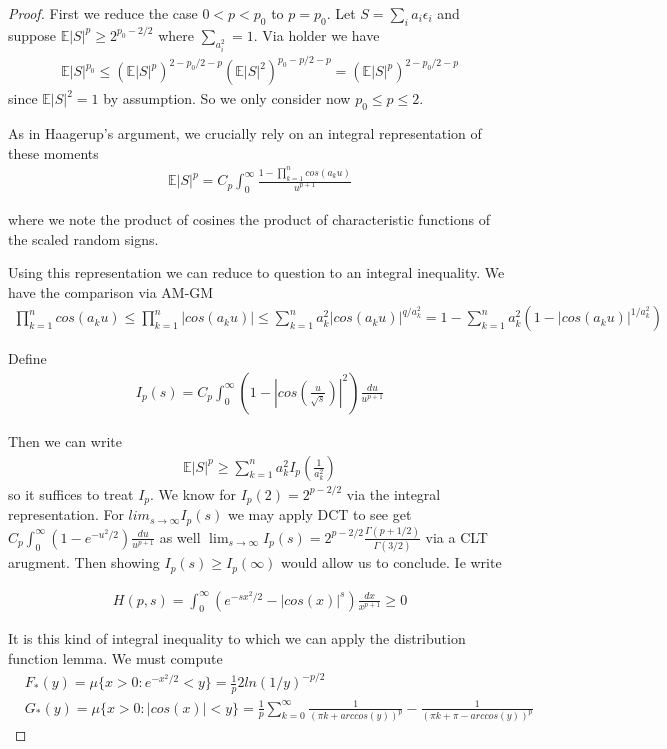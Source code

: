 \documentclass[10pt]{article}
\newcommand{\E}{\mathbb{E}}
\newcommand{\1}{\textbf{1}}
\theoremstyle{remark}
\theoremstyle{definition}
\begin{document}
\begin{proof}
	First we reduce the case $0 < p < p_0$ to $p = p_0$. Let $S = \sum_i a_i \epsilon_i$ and suppose $\E|S|^p \geq 2^{p_0 - 2/2}$ where $\sum_ a_i^2 = 1$. Via holder we have
	\begin{align*}
		\E|S|^{p_0} \leq (\E|S|^p)^{2-p_0/2-p}(\E|S|^2)^{p_0-p/2-p} = (\E|S|^p)^{2-p_0/2-p}
	\end{align*} 
	since $\E|S|^2 = 1$ by assumption. So we only consider now $p_0 \leq p \leq 2$. 

	As in Haagerup's argument, we crucially rely on an integral representation of these moments
	\begin{align*}
		\E|S|^p = C_p\int_0^{\infty}\frac{1-\prod_{k=1}^n cos(a_k u)}{u^{p+1}}
	\end{align*}

	where we note the product of cosines the product of characteristic functions of the scaled random signs.

	Using this representation we can reduce to question to an integral inequality. We have the comparison via AM-GM
	\begin{align*}
		\prod_{k=1}^n cos(a_k u) \leq \prod_{k=1}^n |cos(a_k u)| \leq \sum_{k=1}^n a_k^2|cos(a_k u)|^{q/a_k^2} = 1 - \sum_{k=1}^na_k^2(1- |cos(a_k u)|^{1/a_k^2})
	\end{align*}

	Define 
	\begin{align*}
		I_p(s) = C_p\int_0^{\infty}(1-|cos(\frac{u}{\sqrt{s}})|^2)\frac{du}{u^{p+1}}
	\end{align*}

	Then we can write
	\begin{align*}
		\E|S|^p \geq \sum_{k=1}^na_k^2 I_p(\frac{1}{a_k^2})
	\end{align*}
	so it suffices to treat $I_p$. We know for $I_p(2) = 2^{p-2/2}$ via the integral representation. For $lim_{s \to \infty}I_p(s)$ we may apply DCT to see get $C_p \int_0^{\infty}(1-e^{-u^2/2})\frac{du}{u^{p+1}}$ as well $\lim_{s \to \infty}I_p(s) = 2^{p-2/2}\frac{\Gamma(p+1/2)}{\Gamma(3/2)}$ via a CLT arugment. Then showing $I_p(s) \geq I_p(\infty)$ would allow us to conclude. Ie write

	\begin{align*}
		H(p,s) = \int_0^{\infty}(e^{-sx^2/2} - |cos(x)|^s)\frac{dx}{x^{p+1}} \geq 0 
	\end{align*}

	It is this kind of integral inequality to which we can apply the distribution function lemma. We must compute
	\begin{align*}
		&F_*(y) = \mu\{x > 0 : e^{-x^2/2} < y\} = \frac{1}{p}2ln(1/y)^{-p/2}\\
		&G_*(y) = \mu\{x > 0: |cos(x)| < y\} = \frac{1}{p}\sum_{k=0}^{\infty}\frac{1}{(\pi k + arccos(y))^p} - \frac{1}{(\pi k + \pi - arccos(y))^p}
	\end{align*}


\end{proof}
\end{document}
